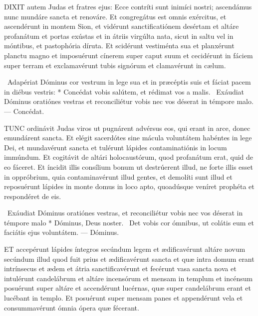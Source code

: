



\lettrine[lines=2]{D}{IXIT} autem Judas et fratres ejus: Ecce contríti sunt inimíci nostri; ascendámus nunc mundáre sancta et renováre. Et congregátus est omnis exércitus, et ascendérunt in montem Sion, et vidérunt sanctificatiónem desértam et altáre profanátum et portas exústas et in átriis virgúlta nata, sicut in saltu vel in móntibus, et pastophória díruta. Et scidérunt vestiménta sua et planxérunt planctu magno et imposuérunt cínerem super caput suum et cecidérunt in fáciem super terram et exclamavérunt tubis signórum et clamavérunt in cælum.

\R\ Adapériat Dóminus cor vestrum in lege sua et in præcéptis suis et fáciat pacem in diébus vestris: * Concédat vobis salútem, et rédimat vos a malis. \V\ Exáudiat Dóminus oratiónes vestras et reconciliétur vobis nec vos déserat in témpore malo. — Concédat.


\lettrine[lines=2]{T}{UNC} ordinávit Judas viros ut pugnárent advérsus eos, qui erant in arce, donec emundárent sancta. Et elégit sacerdótes sine mácula voluntátem habéntes in lege Dei, et mundavérunt sancta et tulérunt lápides contaminatiónis in locum immúndum. Et cogitávit de altári holocaustórum, quod profanátum erat, quid de eo fáceret. Et íncidit illis consílium bonum ut destrúerent illud, ne forte illis esset in oppróbrium, quia contaminavérunt illud gentes, et demolíti sunt illud et reposuérunt lápides in monte domus in loco apto, quoadúsque veníret prophéta et respondéret de eis.

\R\ Exáudiat Dóminus oratiónes vestras, et reconciliétur vobis nec vos déserat in témpore malo * Dóminus, Deus noster. \V\ Det vobis cor ómnibus, ut colátis eum et faciátis ejus voluntátem. — Dóminus.


\lettrine[lines=2]{E}{T} accepérunt lápides íntegros secúndum legem et ædificavérunt altáre novum secúndum illud quod fuit prius et ædificavérunt sancta et quæ intra domum erant intrínsecus et ædem et átria sanctificavérunt et fecérunt vasa sancta nova et intulérunt candelábrum et altáre incensórum et mensam in templum et incénsum posuérunt super altáre et accendérunt lucérnas, quæ super candelábrum erant et lucébant in templo. Et posuérunt super mensam panes et appendérunt vela et consummavérunt ómnia ópera quæ fécerant.


